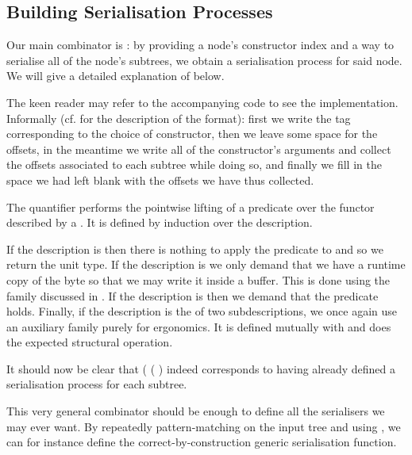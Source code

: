\subsection{Building Serialisation Processes}

Our main combinator is \IdrisFunction{(\#)}: by providing
a node's constructor index
and a way to serialise all of the node's subtrees,
we obtain a serialisation process for said node.
%
We will give a detailed explanation of  below.


The keen reader may refer to the accompanying code to see the implementation.
Informally (cf.  for the description of the format):
first we write the tag corresponding to the choice of constructor,
then we leave some space for the offsets,
in the meantime we write all of the constructor's arguments and collect the offsets
associated to each subtree while doing so,
and finally we fill in the space we had left blank with the offsets
we have thus collected.

The  quantifier performs the pointwise lifting of a predicate over
the functor described by a . It is defined by induction over
the description.


If the description is  then there is nothing to apply
the predicate to and so we return the unit type.
%
If the description is  we only demand that we have a runtime
copy of the byte so that we may write it inside a buffer. This is done using
the  family discussed in .
%
If the description is  then we demand that the
predicate holds.
%
Finally, if the description is the  of two subdescriptions, we once
again use an auxiliary family purely for ergonomics. It is defined mutually
with  and does the expected structural operation.


It should now be clear that
( \IdrisKeyword{(} \IdrisKeyword{)}
( \IdrisKeyword{)}) indeed corresponds
to having already defined a serialisation process for each subtree.

This very general combinator should be enough to define all the
serialisers we may ever want.
%
By repeatedly pattern-matching on the input tree and using \IdrisFunction{(\#)},
we can for instance define the correct-by-construction generic serialisation function.

